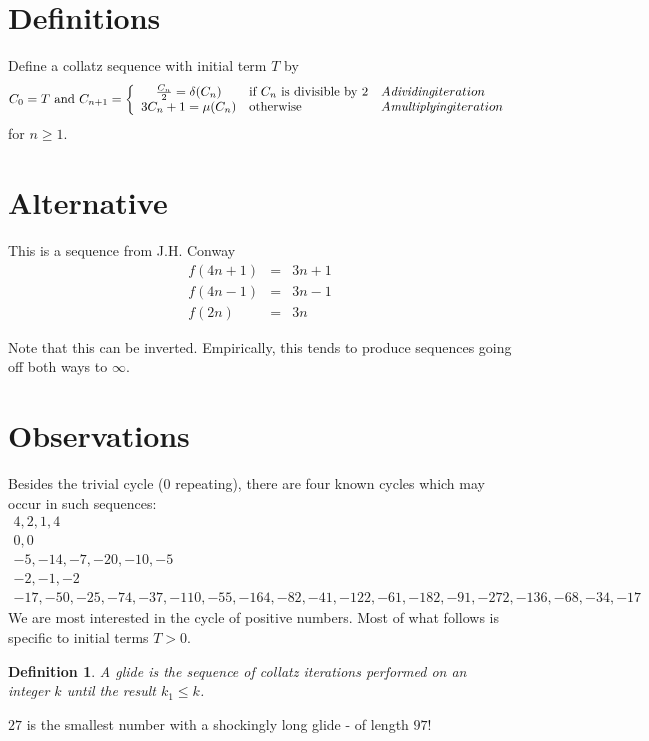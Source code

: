 \documentclass{article}
\newtheorem{definition}{Definition}
\begin{document}
\section{Definitions}

Define a collatz sequence with initial term $T$ by 
\[
C_0=T\textrm{ and }C_{n+1}=\left\{
\begin{array}{cll}\frac{C_n}{2}=\delta(C_n)&\textrm{if }C_n\textrm{ is divisible by }2&A \emph{dividing} iteration\\
3C_n+1=\mu(C_n)&\textrm{otherwise}&A \emph{multiplying} iteration\end{array}\right.
\]
for $n\geq 1$.

\section{Alternative}
This is a sequence from J.H. Conway
\begin{eqnarray*}
f(4n+1)&=&3n+1\\
f(4n-1)&=&3n-1\\
f(2n)&=&3n
\end{eqnarray*}

Note that this can be inverted.  Empirically, this tends to produce sequences going off both ways to $\infty$.

\section{Observations}

Besides the trivial cycle ($0$ repeating), there are four known cycles which may occur in such sequences:
\[\begin{array}{c}
4,2,1,4\\
0,0\\
-5,-14,-7,-20,-10,-5\\
-2,-1,-2\\
-17,-50,-25,-74,-37,-110,-55,-164,-82,-41,-122,-61,-182,-91,-272,-136,-68,-34,-17
\end{array}\]
We are most interested in the cycle of positive numbers.  Most of what follows is specific to initial terms $T>0$.

\begin{definition}
A \emph{glide} is the sequence of collatz iterations performed on an integer $k$ until the result $k_1\leq k$.
\end{definition}

$27$ is the smallest number with a shockingly long glide - of length $97$!
\end{document}
